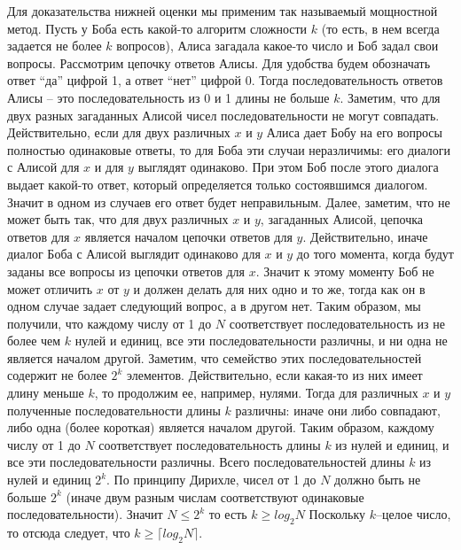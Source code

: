\documentclass{article}
\begin{document}
\newline
Для доказательства нижней оценки мы применим так называемый мощностной метод. Пусть у Боба есть какой-то алгоритм сложности $k$ (то есть, в нем всегда задается не более $k$ вопросов), Алиса загадала какое-то число и Боб задал свои вопросы. Рассмотрим цепочку ответов Алисы. Для удобства будем обозначать ответ “да” цифрой 1, а ответ “нет” цифрой 0. Тогда последовательность ответов Алисы – это последовательность из 0 и 1 длины не больше $k$. Заметим, что для двух разных загаданных Алисой чисел последовательности не могут совпадать. Действительно, если для двух различных $x$ и $y$ Алиса дает Бобу на его вопросы полностью одинаковые ответы, то для Боба эти случаи неразличимы: его диалоги с Алисой для $x$ и для $y$ выглядят одинаково. При этом Боб после этого диалога выдает какой-то ответ, который определяется только состоявшимся диалогом. Значит в одном из случаев его ответ будет неправильным. Далее, заметим, что не может быть так, что для двух различных $x$ и $y$, загаданных Алисой, цепочка ответов для $x$ является началом цепочки ответов для $y$. Действительно, иначе диалог Боба с Алисой выглядит одинаково для $x$ и $y$ до того момента, когда будут заданы все вопросы из цепочки ответов для $x$. Значит к этому моменту Боб не может отличить $x$ от $y$ и должен делать для них одно и то же, тогда как он в одном случае задает следующий вопрос, а в другом нет.
\newline
Таким образом, мы получили, что каждому числу от 1 до $N$ соответствует последовательность из не более чем $k$ нулей и единиц, все эти последовательности различны, и ни одна не является началом другой. Заметим, что семейство этих последовательностей содержит не более $2^k$ элементов. Действительно, если какая-то из них имеет длину меньше $k$, то продолжим ее, например, нулями. Тогда для различных $x$ и $y$ полученные последовательности длины $k$ различны: иначе они либо совпадают, либо одна (более короткая) является началом другой. Таким образом, каждому числу от 1 до $N$ соответствует последовательность длины $k$ из нулей и единиц, и все эти последовательности различны. Всего последовательностей длины $k$ из нулей и единиц $2^k$. По принципу Дирихле, чисел от 1 до $N$ должно быть не больше $2^k$ (иначе двум разным числам соответствуют одинаковые последовательности). Значит $N \leqslant 2^k$ то есть $k \geqslant log_2 N$ Поскольку $k$–целое число, то отсюда следует, что $k \geqslant \lceil log_2 N \rceil$.
\end{document}
